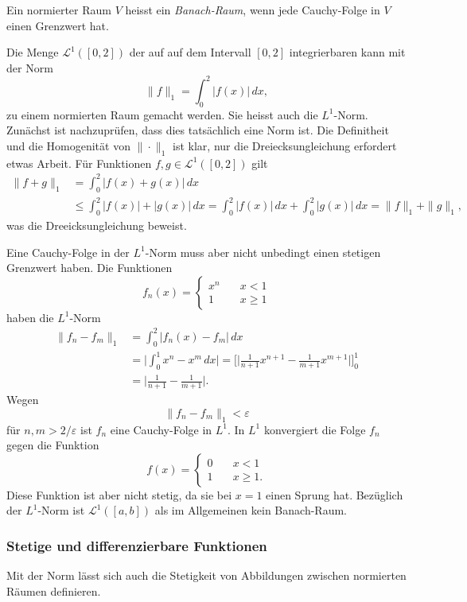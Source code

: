 \begin{definition}
Ein normierter Raum $V$ heisst ein {\em Banach-Raum},
%
wenn jede Cauchy-Folge in $V$ einen Grenzwert hat.
\end{definition}

\begin{beispiel}
Die Menge $\mathscr{L}^1([0,2])$
der auf auf dem Intervall $[0,2]$ integrierbaren kann mit der Norm
\[
\|f\|_1
=
\int_0^2 |f(x)|\,dx,
\]
zu einem normierten Raum gemacht werden.
Sie heisst auch die $L^1$-Norm.
%
Zunächst ist nachzuprüfen, dass dies tatsächlich eine Norm ist.
Die Definitheit und die Homogenität von $\|\cdot\|_1$ ist klar, nur
die Dreiecksungleichung erfordert etwas Arbeit.
Für Funktionen $f,g\in \mathscr{L}^1([0,2])$ gilt
\begin{align*}
\|f+g\|_1
&=
\int_0^2 |f(x)+g(x)|\,dx
\\
&\le 
\int_0^2 |f(x)|+|g(x)|\,dx
=
\int_0^2 |f(x)|\,dx
+
\int_0^2 |g(x)|\,dx
=
\|f\|_1+\|g\|_1,
\end{align*}
was die Dreeicksungleichung beweist.

Eine Cauchy-Folge in der $L^1$-Norm muss aber nicht unbedingt einen
stetigen Grenzwert haben.
Die Funktionen
\[
f_n(x) =
\begin{cases}
x^n&\quad x< 1\\
1&\quad x\ge 1
\end{cases}
\]
haben die $L^1$-Norm
\begin{align*}
\|f_n-f_m\|_1
&=
\int_0^2 |f_n(x)-f_m|\,dx
\\
&=
\biggl|\int_0^1 x^n-x^m\,dx\biggr|
=
\biggl[
\biggl|
\frac{1}{n+1}x^{n+1}
-
\frac{1}{m+1}x^{m+1}
\biggr|
\biggr]_0^1
\\
&=
\biggl|
\frac{1}{n+1}
-
\frac{1}{m+1}\biggr|.
\end{align*}
Wegen
\[
\|f_n-f_m\|_1
<\varepsilon
\]
für $n,m>2/\varepsilon$ ist $f_n$ eine Cauchy-Folge in $L^1$.
In $L^1$ konvergiert die Folge $f_n$ gegen die Funktion
\[
f(x)
=
\begin{cases}
0&\quad x< 1\\
1&\quad x\ge 1.
\end{cases}
\]
Diese Funktion ist aber nicht stetig, da sie bei $x=1$ einen
Sprung hat.
Bezüglich der $L^1$-Norm ist $\mathscr{L}^1([a,b])$ als im Allgemeinen
kein Banach-Raum.
\end{beispiel}

%
%
\subsubsection{Stetige und differenzierbare Funktionen}
Mit der Norm lässt sich auch die Stetigkeit von Abbildungen zwischen
normierten Räumen definieren.

